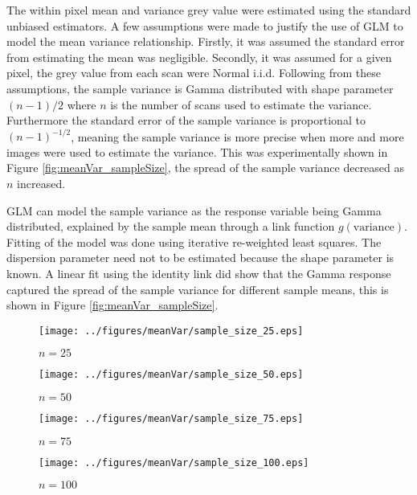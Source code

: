 \documentclass[a4paper]{proc}
\begin{document}
The within pixel mean and variance grey value were estimated using the standard unbiased estimators. A few assumptions were made to justify the use of GLM to model the mean variance relationship. Firstly, it was assumed the standard error from estimating the mean was negligible. Secondly, it was assumed for a given pixel, the grey value from each scan were Normal i.i.d. Following from these assumptions, the sample variance is Gamma distributed with shape parameter $(n-1)/2$ where $n$ is the number of scans used to estimate the variance. Furthermore the standard error of the sample variance is proportional to $(n-1)^{-1/2}$, meaning the sample variance is more precise when more and more images were used to estimate the variance. This was experimentally shown in Figure \ref{fig:meanVar_sampleSize}, the spread of the sample variance decreased as $n$ increased.

GLM can model the sample variance as the response variable being Gamma distributed, explained by the sample mean through a link function $g(\text{variance})$. Fitting of the model was done using iterative re-weighted least squares. The dispersion parameter need not to be estimated because the shape parameter is known. A linear fit using the identity link did show that the Gamma response captured the spread of the sample variance for different sample means, this is shown in Figure \ref{fig:meanVar_sampleSize}.

\begin{figure*}
	\centering
	\begin{subfigure}{0.45\textwidth}
		\centering
		\texttt{[image: ../figures/meanVar/sample\_size\_25.eps]}
		\caption{$n=25$}
	\end{subfigure}
	\begin{subfigure}{0.45\textwidth}
		\centering
		\texttt{[image: ../figures/meanVar/sample\_size\_50.eps]}
		\caption{$n=50$}
	\end{subfigure}
	\begin{subfigure}{0.45\textwidth}
		\centering
		\texttt{[image: ../figures/meanVar/sample\_size\_75.eps]}
		\caption{$n=75$}
	\end{subfigure}
	\begin{subfigure}{0.45\textwidth}
		\centering
		\texttt{[image: ../figures/meanVar/sample\_size\_100.eps]}
		\caption{$n=100$}
	\end{subfigure}
	\caption{Mean and variance frequency density plot of each pixel's grey value in the segmented image of the 3D printed sample. The sample variance and sample mean were estimated using $n$ scans selected at random without replacement. A Gamma GLM was fitted with the identity link. The solid and dotted lines are the mean response and the $\Phi(\pm 1)$ quantiles respectively.}
	\label{fig:meanVar_sampleSize}
\end{figure*}
\end{document}
